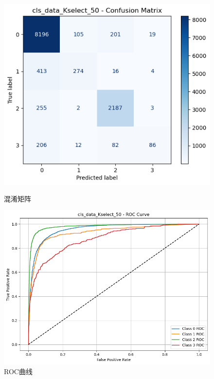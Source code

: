 \documentclass[10pt]{article}
\begin{document}
\begin{figure}[H]
\centering
\begin{minipage}[t]{0.45\textwidth}
  \centering
  \includegraphics[width=\linewidth]{cls_rf_50s.png}
  \caption{混淆矩阵}
  \label{fig:67}
\end{minipage}
\hfill
\begin{minipage}[t]{0.52\textwidth}
  \centering
  \includegraphics[width=\linewidth]{cls_rf_50s2.png}
  \caption{ROC曲线}
  \label{fig:68}
\end{minipage}
\end{figure}
\end{document}
